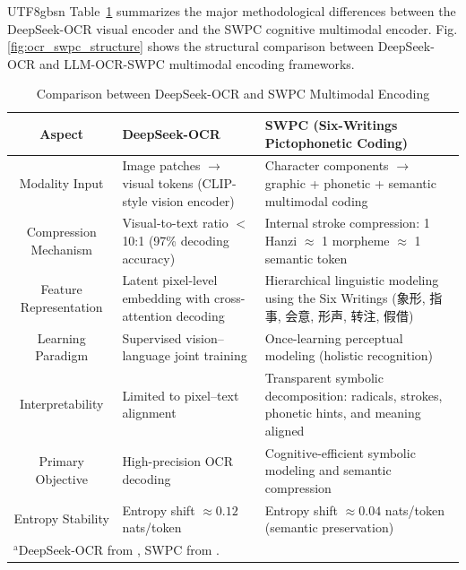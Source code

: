 \documentclass[conference]{IEEEtran}
\begin{document}
\begin{CJK*}{UTF8}{gbsn}
Table~\ref{tab:ocr_swpc_comparison} summarizes the major methodological differences between the DeepSeek-OCR visual encoder and the SWPC cognitive multimodal encoder. Fig. \ref{fig:ocr_swpc_structure} shows the structural comparison between DeepSeek-OCR and LLM-OCR-SWPC multimodal encoding frameworks.

\begin{table}[htbp]
\caption{Comparison between DeepSeek-OCR and SWPC Multimodal Encoding}
\begin{center}
\begin{tabular}{|c|p{4.2cm}|p{6.5cm}|}
\hline
\textbf{Aspect} & \textbf{DeepSeek-OCR} & \textbf{SWPC (Six-Writings Pictophonetic Coding)} \\
\hline

Modality Input &
Image patches $\rightarrow$ visual tokens (CLIP-style vision encoder) &
Character components $\rightarrow$ graphic + phonetic + semantic multimodal coding \\ 
\hline

Compression Mechanism &
Visual-to-text ratio $<$ 10:1 (97\% decoding accuracy) &
Internal stroke compression:
1 Hanzi $\approx$ 1 morpheme $\approx$ 1 semantic token \\
\hline

Feature Representation &
Latent pixel-level embedding with cross-attention decoding &
Hierarchical linguistic modeling using the Six Writings 
(象形, 指事, 会意, 形声, 转注, 假借) \\
\hline

Learning Paradigm &
Supervised vision--language joint training &
Once-learning perceptual modeling (holistic recognition) \\ 
\hline

Interpretability &
Limited to pixel–text alignment &
Transparent symbolic decomposition: radicals, strokes, phonetic hints, and meaning aligned \\
\hline

Primary Objective &
High-precision OCR decoding &
Cognitive-efficient symbolic modeling and semantic compression \\
\hline

Entropy Stability &
Entropy shift $\approx 0.12$ nats/token &
Entropy shift $\approx 0.04$ nats/token (semantic preservation) \\
\hline

\multicolumn{3}{l}{$^{\mathrm{a}}$DeepSeek-OCR from \cite{wei2025deepseek}, SWPC from \cite{weigang2024six}.}
\end{tabular}
\label{tab:ocr_swpc_comparison}
\end{center}
\end{table}



\end{CJK*}
\end{document}
